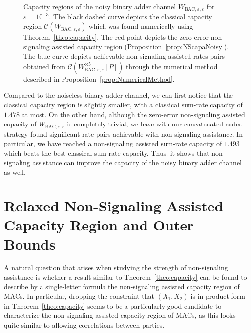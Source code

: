 \documentclass[11pt]{article}
\theoremstyle{definition}
\theoremstyle{remark}
\begin{document}
\begin{figure}[!h]
\begin{center}
      \caption{Capacity regions of the noisy binary adder channel $W_{\text{BAC},\varepsilon,\varepsilon}$ for $\varepsilon = 10^{-3}$. The black dashed curve depicts the classical capacity region $\mathcal{C}(W_{\text{BAC},\varepsilon,\varepsilon})$ which was found numerically using Theorem~\ref{theo:capacity}. The red point depicts the zero-error non-signaling assisted capacity region (Proposition~\ref{prop:NScapaNoisy}). The blue curve depicts achievable non-signaling assisted rates pairs obtained from $\mathcal{C}(W_{\text{BAC},\varepsilon,\varepsilon}^{\otimes 5}[P])$ through the numerical method described in Proposition~\ref{prop:NumericalMethod}.}
    \label{fig:noisyBAC}
    \end{center}
\end{figure}


Compared to the noiseless binary adder channel, we can first notice that the classical capacity region is slightly smaller, with a classical  sum-rate capacity of $1.478$ at most. On the other hand, although the zero-error non-signaling assisted capacity of $W_{\text{BAC},\varepsilon,\varepsilon}$ is completely trivial, we have with our concatenated codes strategy found significant rate pairs achievable with non-signaling assistance. In particular, we have reached a non-signaling assisted sum-rate capacity of $1.493$ which beats the best classical sum-rate capacity. Thus, it shows that non-signaling assistance can improve the capacity of the noisy binary adder channel as well.

\section{Relaxed Non-Signaling Assisted Capacity Region and Outer Bounds}
\label{section:OB}
A natural question that arises when studying the strength of non-signaling assistance is whether a result similar to Theorem~\ref{theo:capacity} can be found to describe by a single-letter formula the non-signaling assisted capacity region of MACs. In particular, dropping the constraint that $(X_1,X_2)$ is in product form in Theorem~\ref{theo:capacity} seems to be a particularly good candidate to characterize the non-signaling assisted capacity region of MACs, as this looks quite similar to allowing correlations between parties.
\end{document}
